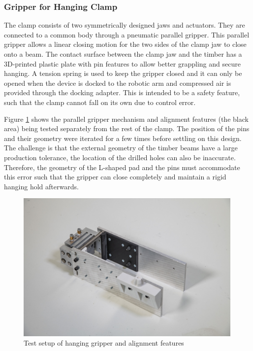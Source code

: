 \subsubsection{Gripper for Hanging Clamp}
\label{subsubsection:exploration-1-gripper-for-hanging-clamp}

The clamp consists of two symmetrically designed jaws and actuators. They are connected to a common body through a pneumatic parallel gripper. This parallel gripper allows a linear closing motion for the two sides of the clamp jaw to close onto a beam.
The contact surface between the clamp jaw and the timber has a 3D-printed plastic plate with pin features to allow better grappling and secure hanging. A tension spring is used to keep the gripper closed and it can only be opened when the device is docked to the robotic arm and compressed air is provided through the docking adapter. This is intended to be a safety feature, such that the clamp cannot fall on its own due to control error.

Figure \ref{fig:hanging-gripper-test} shows the parallel gripper mechanism and alignment features (the black area) being tested separately from the rest of the clamp. The position of the pins and their geometry were iterated for a few times before settling on this design. The challenge is that the external geometry of the timber beams have a large production tolerance, the location of the drilled holes can also be inaccurate. Therefore, the geometry of the L-shaped pad and the pins must accommodate this error such that the gripper can close completely and maintain a rigid hanging hold afterwards.

\begin{figure}[h!]
    \centering
    \includegraphics[width=0.99\textwidth]{images/04-3/cl1-hanging-test.jpg}
    \caption{Test setup of hanging gripper and alignment features}
    \label{fig:hanging-gripper-test}
\end{figure}

